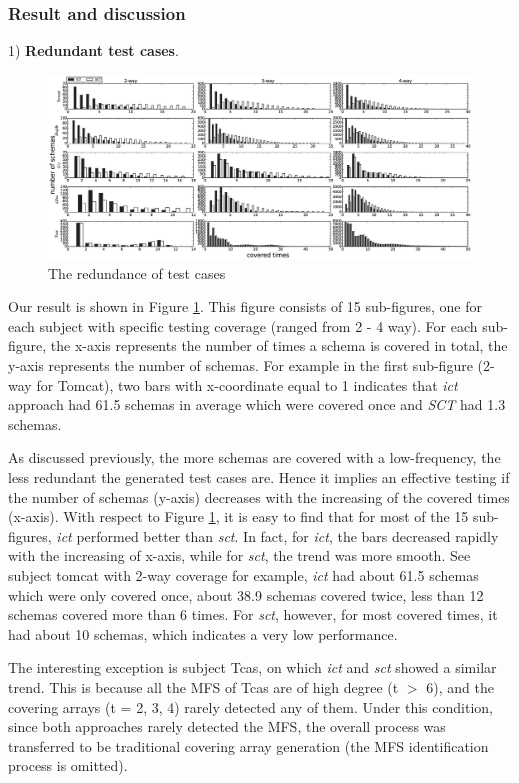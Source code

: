 \documentclass[10pt,journal,compsoc]{IEEEtran}
\begin{document}
\subsubsection{Result and discussion}

1) \textbf{Redundant test cases}.

\begin{figure}[ht]
 \includegraphics[width=7.0in]{ex1.eps}
\caption{The redundance of test cases}
\label{ex1_result}
\end{figure}

Our result is shown in Figure \ref{ex1_result}. This figure consists of 15 sub-figures, one for each subject with specific testing coverage (ranged from 2 - 4 way). For each sub-figure, the x-axis represents the number of times a schema is covered in total, the y-axis represents the number of schemas.  For example in the first sub-figure (2-way for Tomcat), two bars with x-coordinate equal to 1 indicates that \emph{ict} approach had 61.5 schemas in average which were covered once and \emph{SCT} had 1.3 schemas.


As discussed previously, the more schemas are covered with a low-frequency, the less redundant the generated test cases are. Hence it implies an effective testing if the number of schemas (y-axis) decreases with the increasing of the covered times (x-axis). With respect to Figure \ref{ex1_result}, it is easy to find that for most of the 15 sub-figures, \emph{ict} performed better than \emph{sct}. In fact, for \emph{ict}, the bars decreased rapidly with the increasing of x-axis, while for \emph{sct}, the trend was more smooth. See subject tomcat with 2-way coverage for example, \emph{ict} had about 61.5 schemas which were only covered once,  about 38.9 schemas covered twice, less than 12 schemas covered more than 6 times.  For \emph{sct}, however, for most covered times, it had about 10 schemas, which indicates a very low performance.


The interesting exception is subject Tcas, on which \emph{ict} and \emph{sct} showed a similar trend. This is because all the MFS of Tcas are of high degree (t $>$ 6), and the covering arrays (t = 2, 3, 4) rarely detected any of them. Under this condition, since both approaches rarely detected the MFS, the overall process was transferred to be traditional covering array generation (the MFS identification process is omitted).
\end{document}
